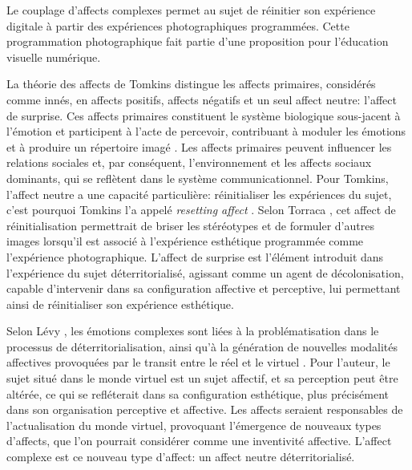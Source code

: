 \documentclass[final,fra]{anthology-ch}         %
\begin{document}
Le couplage d'affects complexes permet au sujet de réinitier son expérience digitale à partir des expériences photographiques programmées. Cette programmation photographique fait partie d'une proposition pour l'éducation visuelle numérique.

La théorie des affects de Tomkins \cite{tomkins1962affect,tomkins1963affect} distingue les affects primaires, considérés comme innés, en affects positifs, affects négatifs et un seul affect neutre: l'affect de surprise. Ces affects primaires constituent le système biologique sous-jacent à l'émotion et participent à l'acte de percevoir, contribuant à moduler les émotions et à produire un répertoire imagé \cite{tomkins1962affect}. Les affects primaires peuvent influencer les relations sociales et, par conséquent, l'environnement et les affects sociaux dominants, qui se reflètent dans le système communicationnel. Pour Tomkins, l'affect neutre a une capacité particulière: réinitialiser les expériences du sujet, c'est pourquoi Tomkins l'a appelé \emph{resetting affect} \cite{tomkins1962affect}. Selon Torraca \cite{torraca2024antropofagia}, cet affect de réinitialisation permettrait de briser les stéréotypes et de formuler d'autres images lorsqu'il est associé à l'expérience esthétique programmée comme l'expérience photographique. L'affect de surprise est l'élément introduit dans l'expérience du sujet déterritorialisé, agissant comme un agent de décolonisation, capable d'intervenir dans sa configuration affective et perceptive, lui permettant ainsi de réinitialiser son expérience esthétique.

Selon Lévy \cite{levy2007virtual}, les émotions complexes sont liées à la problématisation dans le processus de déterritorialisation, ainsi qu'à la génération de nouvelles modalités affectives provoquées par le transit entre le réel et le virtuel \cite{levy2007virtual}. Pour l'auteur, le sujet situé dans le monde virtuel est un sujet affectif, et sa perception peut être altérée, ce qui se refléterait dans sa configuration esthétique, plus précisément dans son organisation perceptive et affective. Les affects seraient responsables de l'actualisation du monde virtuel, provoquant l'émergence de nouveaux types d'affects, que l'on pourrait considérer comme une inventivité affective. L'affect complexe est ce nouveau type d'affect: un affect neutre déterritorialisé.
\end{document}
